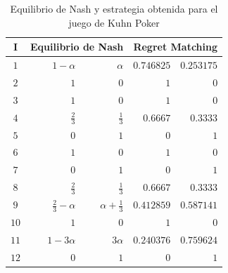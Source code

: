 \begin{table}[]
    \centering
    \begin{tabular}{c|r r| r r}
        I & \multicolumn{2}{|c|}{Equilibrio de Nash} & \multicolumn{2}{|c}{Regret Matching} \\ \hline
         $1$ & $1-\alpha$ & $\alpha$ & $0.746825$ & $0.253175$ \\
         $2$ & $1$ & $0$ & $1$ & $0$ \\
         $3$ & $1$ & $0$ & $1$ & $0$ \\
         $4$ & $\frac{2}{3}$& $\frac{1}{3}$ & $0.6667$ & $0.3333$ \\
         $5$ & $0$ & $1$ & $0$ & $1$ \\
         $6$ & $1$ & $0$ & $1$ & $0$ \\
         $7$ & $0$ & $1$ & $0$ & $1$ \\
         $8$ & $\frac{2}{3}$ & $\frac{1}{3}$ & $0.6667$ & $0.3333$ \\
         $9$ & $\frac{2}{3} - \alpha$ & $\alpha + \frac{1}{3}$ & $0.412859$ & $0.587141$ \\
        $10$ & $1$ & $0$ & $1$ & $0$ \\
        $11$ & $1 - 3 \alpha$ & $3 \alpha$ & $0.240376$ & $0.759624$ \\
        $12$ & $0$ & $1$ & $0$ & $1$ \\ \hline
    \end{tabular}
    \caption{Equilibrio de Nash y estrategia obtenida para el juego de Kuhn Poker}
    \label{tab:estrategia-kuhn-poker}
\end{table}

